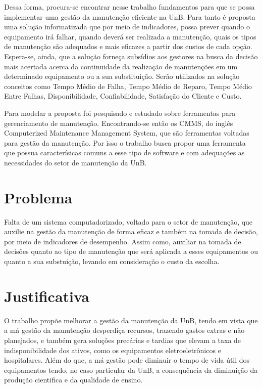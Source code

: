 Dessa forma, procura-se encontrar nesse trabalho fundamentos para que se possa implementar uma gestão da manutenção eficiente na UnB. Para tanto é proposta uma solução informatizada que por meio de indicadores, possa prever quando o equipamento irá falhar, quando deverá ser realizada a manutenção, quais os tipos de manutenção são adequados e mais eficazes a partir dos custos de cada opção. Espera-se, ainda, que a solução forneça subsídios aos gestores na busca da decisão mais acertada acerca da continuidade da realização de manutenções em um determinado equipamento ou a sua substituição. Serão utilizados na solução conceitos como Tempo Médio de Falha, Tempo Médio de Reparo, Tempo Médio Entre Falhas, Disponibilidade, Confiabilidade, Satisfação do Cliente e Custo. 

Para modelar a proposta foi pesquisado e estudado sobre ferramentas para gerenciamento de manutenção. Encontrando-se então os CMMS, do inglês Computerized Maintenance Management System, que são ferramentas voltadas para gestão da manutenção. Por isso o trabalho busca propor uma ferramenta que possua caracterísicas comuns a esse tipo de software e com adequações as necessidades do setor de manutenção da UnB. 



\section{Problema}

Falta de um sistema computadorizado, voltado para o setor de manutenção, que auxilie na gestão da manutenção de forma eficaz e também na tomada de decisão, por meio de indicadores de desempenho. Assim como, auxiliar na tomada de decisões quanto ao tipo de manutenção que será aplicada a esses equipamentos ou quanto a sua substuição, levando em consideração o custo da escolha. 



\section{Justificativa}

O trabalho propõe melhorar a gestão da manutenção da UnB, tendo em vista que a má gestão da manutenção desperdiça recursos, trazendo gastos extras e não planejados, e também gera soluções precárias e tardias que elevam a taxa de indisponibilidade dos ativos, como os equipamentos eletroeletrônicos e hospitalares. Além do que, a má gestão pode diminuir o tempo de vida útil dos equipamentos tendo, no caso particular da UnB, a consequência da diminuição da produção cientifica e da qualidade de ensino.

